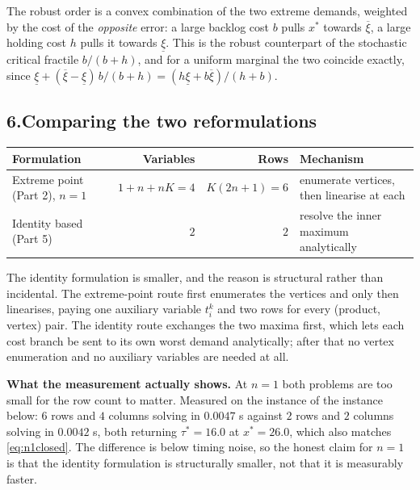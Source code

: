 \documentclass[11pt]{article}
\theoremstyle{definition}
\begin{document}
The robust order is a convex combination of the two extreme demands,
weighted by the cost of the \emph{opposite} error: a large backlog cost
$b$ pulls $x^{*}$ towards $\overline{\xi}$, a large holding cost $h$ pulls
it towards $\underline{\xi}$. This is the robust counterpart of the
stochastic critical fractile $b/(b+h)$, and for a uniform marginal the two
coincide exactly, since
$\underline{\xi} + (\overline{\xi}-\underline{\xi})\,b/(b+h)
 = (h\underline{\xi} + b\overline{\xi})/(h+b)$.

\subsection*{6.\quad Comparing the two reformulations}

\begin{center}
\begin{tabular}{@{}lrrl@{}}
\toprule
Formulation & Variables & Rows & Mechanism \\
\midrule
Extreme point (Part 2), $n=1$ &
  $1+n+nK = 4$ & $K(2n+1) = 6$ &
  enumerate vertices, then linearise at each \\
Identity based (Part 5) &
  $2$ & $2$ &
  resolve the inner maximum analytically \\
\bottomrule
\end{tabular}
\end{center}

The identity formulation is smaller, and the reason is structural rather
than incidental. The extreme-point route first enumerates the vertices and
only then linearises, paying one auxiliary variable $t^{k}_i$ and two rows
for every (product, vertex) pair. The identity route exchanges the two
maxima first, which lets each cost branch be sent to its own worst
demand analytically; after that no vertex enumeration and no auxiliary
variables are needed at all.

\textbf{What the measurement actually shows.} At $n=1$ both problems are
too small for the row count to matter. Measured on the instance of
the instance below: $6$ rows and $4$ columns solving in $0.0047$ s against $2$
rows and $2$ columns solving in $0.0042$ s, both returning
$\tau^{*} = 16.0$ at $x^{*} = 26.0$, which also matches
\eqref{eq:n1closed}. The difference is below timing noise, so the honest
claim for $n=1$ is that the identity formulation is structurally smaller,
not that it is measurably faster.
\end{document}
